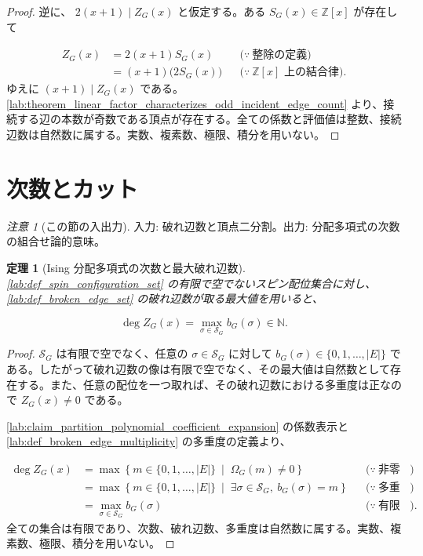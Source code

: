 \documentclass[11pt,a4paper]{article}
\newtheorem{theorem}[definition]{定理}
\theoremstyle{remark}
\newtheorem{remark}[definition]{注意}
\begin{document}
\begin{proof}
逆に、
$2(x+1)\mid Z_G(x)$
 と仮定する。ある 
$S_G(x)\in\mathbb Z[x]$
 が存在して

\[\begin{aligned}
Z_G(x)
&=2(x+1)S_G(x)
&&\bigl(\because\ \text{整除の定義}\bigr)\\
&=(x+1)\bigl(2S_G(x)\bigr)
&&\bigl(\because\ \mathbb Z[x]\text{ 上の結合律}\bigr).
\end{aligned}\]
ゆえに 
$(x+1)\mid Z_G(x)$
 である。
\cref{lab:theorem_linear_factor_characterizes_odd_incident_edge_count}
 より、接続する辺の本数が奇数である頂点が存在する。全ての係数と評価値は整数、接続辺数は自然数に属する。実数、複素数、極限、積分を用いない。

\end{proof}

\section{次数とカット}

\begin{remark}[この節の入出力]
入力: 破れ辺数と頂点二分割。出力: 分配多項式の次数の組合せ論的意味。

\end{remark}

\begin{theorem}[Ising 分配多項式の次数と最大破れ辺数]\label{lab:theorem_partition_polynomial_degree_maximum_broken_edge_count}
\cref{lab:def_spin_configuration_set}
 の有限で空でないスピン配位集合に対し、
\cref{lab:def_broken_edge_set}
 の破れ辺数が取る最大値を用いると、

\[\deg Z_G(x)
=
\max_{\sigma\in\mathcal S_G} b_G(\sigma)
\in\mathbb N.\]
\end{theorem}
\begin{proof}
$\mathcal S_G$
 は有限で空でなく、任意の 
$\sigma\in\mathcal S_G$
 に対して 
$b_G(\sigma)\in\{0,1,\ldots,|E|\}$
 である。したがって破れ辺数の像は有限で空でなく、その最大値は自然数として存在する。また、任意の配位を一つ取れば、その破れ辺数における多重度は正なので 
$Z_G(x)\ne0$
 である。

\cref{lab:claim_partition_polynomial_coefficient_expansion}
 の係数表示と 
\cref{lab:def_broken_edge_multiplicity}
 の多重度の定義より、

\[\begin{aligned}
\deg Z_G(x)
&=
\max\left\{
  m\in\{0,1,\ldots,|E|\}
  \ \middle|\;
  \Omega_G(m)\ne0
\right\}
&&\bigl(\because\ \text{非零多項式の次数の定義}\bigr)\\
&=
\max\left\{
  m\in\{0,1,\ldots,|E|\}
  \ \middle|\;
  \exists\sigma\in\mathcal S_G,\ b_G(\sigma)=m
\right\}
&&\bigl(\because\ \text{多重度が正である条件}\bigr)\\
&=
\max_{\sigma\in\mathcal S_G} b_G(\sigma)
&&\bigl(\because\ \text{有限像集合の定義}\bigr).
\end{aligned}\]
全ての集合は有限であり、次数、破れ辺数、多重度は自然数に属する。実数、複素数、極限、積分を用いない。

\end{proof}
\end{document}
